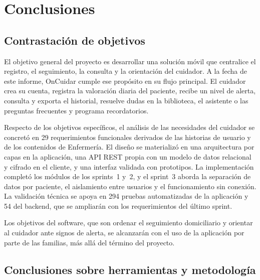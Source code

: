 \chapter[Conclusiones]{Conclusiones}

\section{Contrastación de objetivos}

El objetivo general del proyecto es desarrollar una solución móvil que
centralice el registro, el seguimiento, la consulta y la orientación del
cuidador. A la fecha de este informe, OnCuidar cumple ese propósito en su flujo
principal. El cuidador crea su cuenta, registra la valoración diaria del
paciente, recibe un nivel de alerta, consulta y exporta el historial, resuelve
dudas en la biblioteca, el asistente o las preguntas frecuentes y programa
recordatorios.

Respecto de los objetivos específicos, el análisis de las necesidades del
cuidador se concretó en 29 requerimientos funcionales derivados de las historias
de usuario y de los contenidos de Enfermería. El diseño se materializó en una
arquitectura por capas en la aplicación, una API REST propia con un modelo de
datos relacional y cifrado en el cliente, y una interfaz validada con
prototipos. La implementación completó los módulos de
los sprints~1 y~2, y el sprint~3 aborda la separación de datos por paciente, el
aislamiento entre usuarios y el funcionamiento sin conexión. La validación
técnica se apoya en 294 pruebas automatizadas de la aplicación y 54 del
backend, que se ampliarán con los requerimientos del último sprint.

Los objetivos del software, que son ordenar el seguimiento domiciliario y
orientar al cuidador ante signos de alerta, se alcanzarán con el uso de la
aplicación por parte de las familias, más allá del término del proyecto.

\section{Conclusiones sobre herramientas y metodología}

